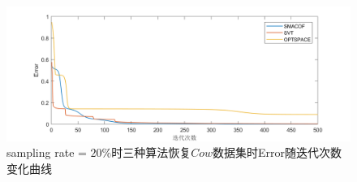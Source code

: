 \begin{figure}[h]
	\centering
	\includegraphics[width=1.0\textwidth]{figure/CowError.png}
	\caption{sampling rate = $20\%$时三种算法恢复$Cow$数据集时Error随迭代次数变化曲线}
 	\label{fig:cow_error}
\end{figure}